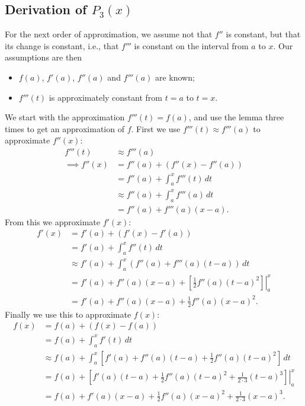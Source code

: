\subsection{Derivation of $P_3(x)$}
For the next order of approximation, we assume not that $f''$ is constant,
but that its change is constant, i.e., that $f'''$ is constant
on the interval from $a$ to $x$.  Our assumptions are then
\begin{itemize}
\item $f(a)$, $f'(a)$, $f''(a)$ and $f'''(a)$ are known;
\item $f'''(t)$ is approximately constant from $t=a$ to $t=x$.
\end{itemize}
We start with the approximation $f'''(t)=f(a)$, and use the
lemma three times to get an approximation of $f$.  First we
use $f'''(t)\approx f'''(a)$ to approximate $f''(x)$:
\begin{align*}
         f'''(t)&\approx f'''(a)\\
\implies f''(x)&=f''(a)+(f''(x)-f''(a))\\
              &= f''(a)+\int_a^xf'''(t)\,dt\\
              &\approx f''(a)+\int_a^xf'''(a)\,dt\\
              &=f''(a)+f'''(a)(x-a).\end{align*}
From this we approximate $f'(x)$:
\begin{align*}
f'(x)&=f'(a)+(f'(x)-f'(a))\\
     &= f'(a)+\int_a^xf''(t)\,dt\\
     &\approx f'(a)+\int_a^x\left(f''(a)+f'''(a)(t-a)\right)\,dt\\
     &=f'(a)+f''(a)(x-a)+\left.\left[\frac12f''(a)(t-a)^2\right]
                   \right|_a^x\\
     &=f'(a)+f''(a)(x-a)+\frac12f''(a)(x-a)^2.
\end{align*}
Finally we use this to approximate $f(x)$:
\begin{align*}
f(x)&=f(a)+(f(x)-f(a))\\
    &=f(a)+\int_a^xf'(t)\,dt\\
    &\approx f(a)+\int_a^x\left[f'(a)+f''(a)(t-a)+\frac12f''(a)(t-a)^2
                \right]\,dt\\
    &=f(a)+\left.\left[f'(a)(t-a)+\frac12f''(a)(t-a)^2+\frac1{2\cdot3}
                        (t-a)^3\right]\right|_a^x\\
    &=f(a)+f'(a)(x-a)+\frac12f''(a)(x-a)^2+\frac1{2\cdot3}(x-a)^3.
\end{align*}
